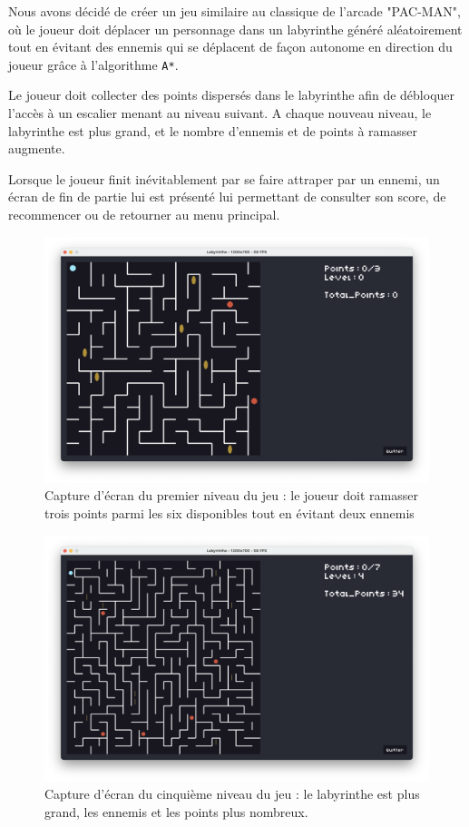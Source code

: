 \documentclass[12pt]{scrreprt} %
\begin{document}
Nous avons décidé de créer un jeu similaire au classique de l'arcade "PAC-MAN", où le joueur doit déplacer un personnage dans un labyrinthe généré aléatoirement tout en évitant des ennemis qui se déplacent de façon autonome en direction du joueur grâce à l'algorithme \texttt{A*}.

Le joueur doit collecter des points dispersés dans le labyrinthe afin de débloquer l'accès à un escalier menant au niveau suivant. A chaque nouveau niveau, le labyrinthe est plus grand, et le nombre d'ennemis et de points à ramasser augmente.

Lorsque le joueur finit inévitablement par se faire attraper par un ennemi, un écran de fin de partie lui est présenté lui permettant de consulter son score, de recommencer ou de retourner au menu principal.

\begin{figure}[h]
    \centering
    \includegraphics[width=\textwidth]{images/gamelevel0.png}
    \caption{Capture d'écran du premier niveau du jeu : le joueur doit ramasser trois points parmi les six disponibles tout en évitant deux ennemis}
\end{figure}

\begin{figure}[h]
    \centering
    \includegraphics[width=\textwidth]{images/gamelevel4.png}
    \caption{Capture d'écran du cinquième niveau du jeu : le labyrinthe est plus grand, les ennemis et les points plus nombreux.}
\end{figure}
\end{document}
